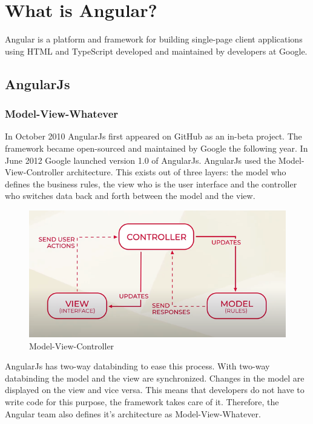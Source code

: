 \section{What is Angular?}
Angular is a platform and framework for building single-page client applications using HTML and TypeScript developed and maintained by developers at Google.
\autocite{Angular.io}

\subsection{AngularJs}
\subsubsection{Model-View-Whatever}
In October 2010 AngularJs first appeared on GitHub as an in-beta project. The framework became open-sourced and maintained by Google the following year. In June 2012 Google launched version 1.0 of AngularJs. \autocite{Brandrick2017} AngularJs used the Model-View-Controller architecture. This exists out of three layers: the model who defines the business rules, the view who is the user interface and the controller who switches data back and forth between the model and the view.
\autocite{AltexSoft}

\begin{figure}[h!]
    \caption{Model-View-Controller}
    \centering
    \includegraphics[width=\textwidth]{img/mvc.png} 
\end{figure}

AngularJs has two-way databinding to ease this process. With two-way databinding the model and the view are synchronized. Changes in the model are displayed on the view and vice versa. This means that developers do not have to write code for this purpose, the framework takes care of it. Therefore, the Angular team also defines it's architecture as Model-View-Whatever.

